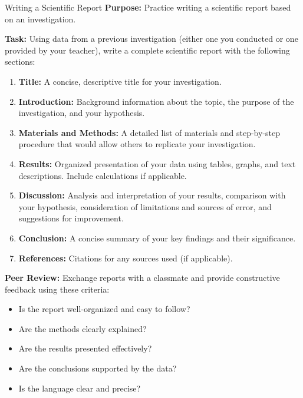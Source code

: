 \begin{investigation}{Writing a Scientific Report}
\textbf{Purpose:} Practice writing a scientific report based on an investigation.

\textbf{Task:} Using data from a previous investigation (either one you conducted or one provided by your teacher), write a complete scientific report with the following sections:

\begin{enumerate}
    \item \textbf{Title:} A concise, descriptive title for your investigation.
    
    \item \textbf{Introduction:} Background information about the topic, the purpose of the investigation, and your hypothesis.
    
    \item \textbf{Materials and Methods:} A detailed list of materials and step-by-step procedure that would allow others to replicate your investigation.
    
    \item \textbf{Results:} Organized presentation of your data using tables, graphs, and text descriptions. Include calculations if applicable.
    
    \item \textbf{Discussion:} Analysis and interpretation of your results, comparison with your hypothesis, consideration of limitations and sources of error, and suggestions for improvement.
    
    \item \textbf{Conclusion:} A concise summary of your key findings and their significance.
    
    \item \textbf{References:} Citations for any sources used (if applicable).
\end{enumerate}

\textbf{Peer Review:} Exchange reports with a classmate and provide constructive feedback using these criteria:
\begin{itemize}
    \item Is the report well-organized and easy to follow?
    \item Are the methods clearly explained?
    \item Are the results presented effectively?
    \item Are the conclusions supported by the data?
    \item Is the language clear and precise?
\end{itemize}
\end{investigation}


